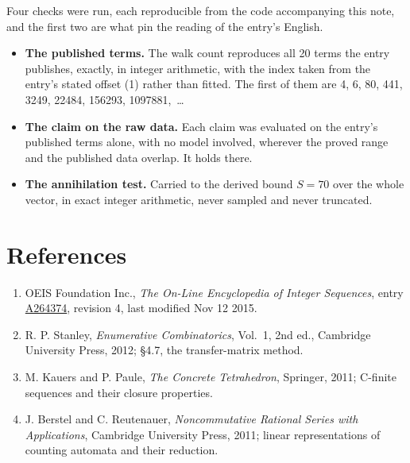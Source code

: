 \documentclass[11pt]{article}
\theoremstyle{definition}
\begin{document}
Four checks were run, each reproducible from the code accompanying this note, and the first two are what pin the reading of the entry's English.

\begin{itemize}

\item {\bfseries The published terms.} The walk count reproduces all 20 terms the entry publishes, exactly, in integer arithmetic, with the index taken from the entry's stated offset (1) rather than fitted. The first of them are 4, 6, 80, 441, 3249, 22484, 156293, 1097881,~\dots

\item {\bfseries The claim on the raw data.} Each claim was evaluated on the entry's published terms alone, with no model involved, wherever the proved range and the published data overlap. It holds there.

\item {\bfseries The annihilation test.} Carried to the derived bound $S = 70$ over the whole vector, in exact integer arithmetic, never sampled and never truncated.

\end{itemize}

\section{References}

\begin{enumerate}

\item OEIS Foundation Inc., \emph{The On-Line Encyclopedia of Integer Sequences}, entry \href{https://oeis.org/A264374}{A264374}, revision 4, last modified Nov 12 2015.

\item R. P. Stanley, \emph{Enumerative Combinatorics}, Vol.~1, 2nd ed., Cambridge University Press, 2012; \S4.7, the transfer-matrix method.

\item M. Kauers and P. Paule, \emph{The Concrete Tetrahedron}, Springer, 2011; C-finite sequences and their closure properties.

\item J. Berstel and C. Reutenauer, \emph{Noncommutative Rational Series with Applications}, Cambridge University Press, 2011; linear representations of counting automata and their reduction.

\end{enumerate}
\end{document}
